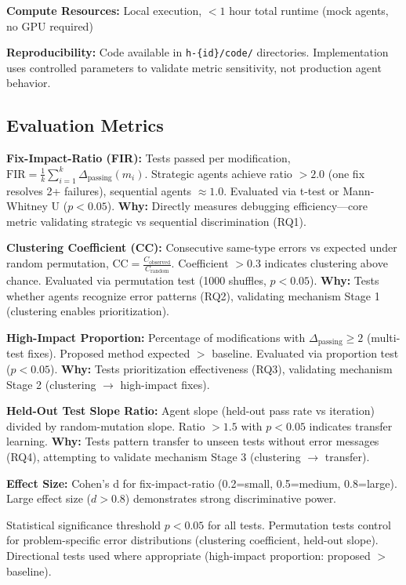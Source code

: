 \textbf{Compute Resources:} Local execution, $<1$ hour total runtime (mock agents, no GPU required)

\textbf{Reproducibility:} Code available in \texttt{h-\{id\}/code/} directories. Implementation uses controlled parameters to validate metric sensitivity, not production agent behavior.

\subsection{Evaluation Metrics}

\textbf{Fix-Impact-Ratio (FIR):} Tests passed per modification, $\text{FIR} = \frac{1}{k} \sum_{i=1}^{k} \Delta_{\text{passing}}(m_i)$. Strategic agents achieve ratio $> 2.0$ (one fix resolves 2+ failures), sequential agents $\approx 1.0$. Evaluated via t-test or Mann-Whitney U ($p < 0.05$). \textbf{Why:} Directly measures debugging efficiency---core metric validating strategic vs sequential discrimination (RQ1).

\textbf{Clustering Coefficient (CC):} Consecutive same-type errors vs expected under random permutation, $\text{CC} = \frac{C_{\text{observed}}}{C_{\text{random}}}$. Coefficient $> 0.3$ indicates clustering above chance. Evaluated via permutation test (1000 shuffles, $p < 0.05$). \textbf{Why:} Tests whether agents recognize error patterns (RQ2), validating mechanism Stage 1 (clustering enables prioritization).

\textbf{High-Impact Proportion:} Percentage of modifications with $\Delta_{\text{passing}} \geq 2$ (multi-test fixes). Proposed method expected $>$ baseline. Evaluated via proportion test ($p < 0.05$). \textbf{Why:} Tests prioritization effectiveness (RQ3), validating mechanism Stage 2 (clustering $\rightarrow$ high-impact fixes).

\textbf{Held-Out Test Slope Ratio:} Agent slope (held-out pass rate vs iteration) divided by random-mutation slope. Ratio $> 1.5$ with $p < 0.05$ indicates transfer learning. \textbf{Why:} Tests pattern transfer to unseen tests without error messages (RQ4), attempting to validate mechanism Stage 3 (clustering $\rightarrow$ transfer).

\textbf{Effect Size:} Cohen's d for fix-impact-ratio (0.2=small, 0.5=medium, 0.8=large). Large effect size ($d > 0.8$) demonstrates strong discriminative power.

Statistical significance threshold $p < 0.05$ for all tests. Permutation tests control for problem-specific error distributions (clustering coefficient, held-out slope). Directional tests used where appropriate (high-impact proportion: proposed $>$ baseline).
